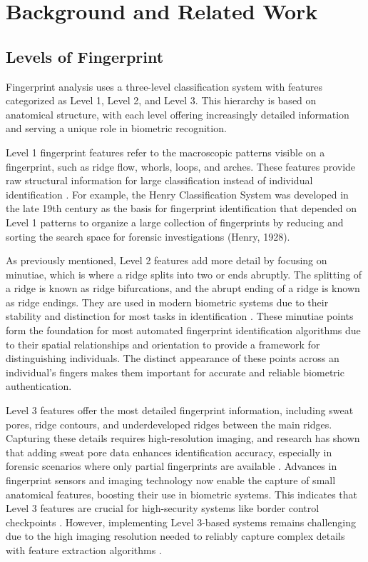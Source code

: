 \section{Background and Related Work}
\subsection{Levels of Fingerprint}

Fingerprint analysis uses a three-level classification system with features categorized as Level 1, Level 2, and Level 3. This hierarchy is based on anatomical structure, with each level offering increasingly detailed information and serving a unique role in biometric recognition.

Level 1 fingerprint features refer to the macroscopic patterns visible on a fingerprint, such as ridge flow, whorls, loops, and arches. These features provide raw structural information for large classification instead of individual identification \parencite{maioDirectGrayscaleMinutiae1997}. For example, the Henry Classification System was developed in the late 19th century as the basis for fingerprint identification that depended on Level 1 patterns to organize a large collection of fingerprints by reducing and sorting the search space for forensic investigations (Henry, 1928).

As previously mentioned, Level 2 features add more detail by focusing on minutiae, which is where a ridge splits into two or ends abruptly. The splitting of a ridge is known as ridge bifurcations, and the abrupt ending of a ridge is known as ridge endings. They are used in modern biometric systems due to their stability and distinction for most tasks in identification \parencite{jainPoresRidgesHighResolution2007,maltoni2009handbook}. These minutiae points form the foundation for most automated fingerprint identification algorithms due to their spatial relationships and orientation to provide a framework for distinguishing individuals. The distinct appearance of these points across an individual's fingers makes them important for accurate and reliable biometric authentication.

Level 3 features offer the most detailed fingerprint information, including sweat pores, ridge contours, and underdeveloped ridges between the main ridges. Capturing these details requires high-resolution imaging, and research has shown that adding sweat pore data enhances identification accuracy, especially in forensic scenarios where only partial fingerprints are available \parencite{zhaoAdaptiveFingerprintPore2010}. Advances in fingerprint sensors and imaging technology now enable the capture of small anatomical features, boosting their use in biometric systems. This indicates that Level 3 features are crucial for high-security systems like border control checkpoints \parencite{liuOneClassFingerprintPresentation2021,sunNewApproachAutomated2023, zhangUniformRepresentationModel2024}. However, implementing Level 3-based systems remains challenging due to the high imaging resolution needed to reliably capture complex details with feature extraction algorithms \parencite{zhangSweatGlandExtraction2023,donidalabatiNovelPoreExtraction2018}.
